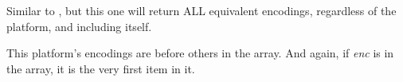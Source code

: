 \label{wxencodingconvertergetallequivalents}


Similar to 
, 
but this one will return ALL 
equivalent encodings, regardless of the platform, and including itself.

This platform's encodings are before others in the array. And again, if {\it enc} is in the array,
it is the very first item in it.


